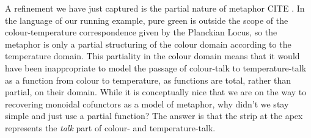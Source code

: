 A refinement we have just captured is the partial nature of metaphor \bR CITE \e. In the language of our running example, pure green is outside the scope of the colour-temperature correspondence given by the Planckian Locus, so the metaphor is only a partial structuring of the colour domain according to the temperature domain. This partiality in the colour domain means that it would have been inappropriate to model the passage of colour-talk to temperature-talk as a function from colour to temperature, as functions are total, rather than partial, on their domain. While it is conceptually nice that we are on the way to recovering monoidal cofunctors as a model of metaphor, why didn't we stay simple and just use a partial function? The answer is that the strip at the apex represents the \emph{talk} part of colour- and temperature-talk.

